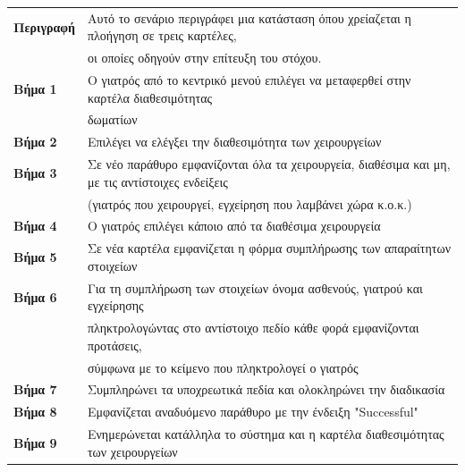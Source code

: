 \documentclass{article}
\newcommand\T{\rule{0pt}{2.6ex}}       %
\newcommand\B{\rule[-1.2ex]{0pt}{0pt}}
\begin{document}
 \begin{center}
     \begin{tabular}{|l|l|}
     \hline
      \textbf{Περιγραφή} & Αυτό το σενάριο περιγράφει μια κατάσταση όπου χρείαζεται η πλοήγηση σε τρεις καρτέλες, \T \\& οι οποίες οδηγούν στην επίτευξη του στόχου. \B \\ 
      \hline
      \textbf{Βήμα 1} & Ο γιατρός από το κεντρικό μενού επιλέγει να μεταφερθεί στην καρτέλα διαθεσιμότητας \T \\& δωματίων \B \\
      \hline
      \textbf{Βήμα 2} & Επιλέγει να ελέγξει την διαθεσιμότητα των χειρουργείων \T\B \\ 
      \hline
      \textbf{Βήμα 3} & Σε νέο παράθυρο εμφανίζονται όλα τα χειρουργεία, διαθέσιμα και μη, με τις αντίστοιχες ενδείξεις \T \\& (γιατρός που χειρουργεί, εγχείρηση που λαμβάνει χώρα κ.ο.κ.) \B \\
      \hline
      \textbf{Βήμα 4} & Ο γιατρός επιλέγει κάποιο από τα διαθέσιμα χειρουργεία \T\B \\
      \hline
      \textbf{Βήμα 5} & Σε νέα καρτέλα εμφανίζεται η φόρμα συμπλήρωσης των απαραίτητων στοιχείων \T\B \\
      \hline
      \textbf{Βήμα 6} & Για τη συμπλήρωση των στοιχείων όνομα ασθενούς, γιατρού και εγχείρησης \T \\& πληκτρολογώντας στο αντίστοιχο πεδίο κάθε φορά εμφανίζονται προτάσεις, \\& σύμφωνα με το κείμενο που πληκτρολογεί ο γιατρός \B \\
      \hline      
      \textbf{Βήμα 7} & Συμπληρώνει τα υποχρεωτικά πεδία και ολοκληρώνει την διαδικασία\T\B \\
      \hline
      \textbf{Βήμα 8} & Εμφανίζεται αναδυόμενο παράθυρο με την ένδειξη "Successful" \T\B \\
      \hline
      \textbf{Βήμα 9} & Ενημερώνεται κατάλληλα το σύστημα και η καρτέλα διαθεσιμότητας των χειρουργείων \T\B \\
      \hline
     \end{tabular}
 \end{center}
 
\end{document}
